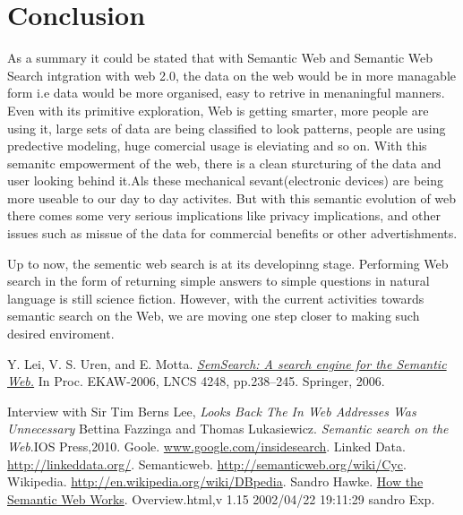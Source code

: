 \documentclass[12pt,a4]{article}
\begin{document}
\section{Conclusion}
As a summary it could be stated that with Semantic Web and Semantic Web Search intgration with web 2.0, the data on the web would be in more managable form i.e  data would be more organised, easy to  retrive in menaningful manners. Even with its primitive exploration, Web is getting smarter, more people are using it, large sets of data are being classified to look patterns, people are using predective modeling, huge comercial usage is eleviating and so on. With this semanitc empowerment of the web, there is a clean sturcturing of the data and user looking behind it.Als these mechanical sevant(electronic devices) are being more useable to our day to day activites. But with this semantic evolution of web there comes some very serious implications like privacy implications, and other issues such as missue of the data for commercial benefits or other advertishments.

Up to now, the sementic web search is at its developinng stage. Performing Web search in the form of returning simple answers to simple questions in natural language is still science fiction. However, with the current activities towards semantic search on the Web, we are moving one step closer to making such desired enviroment.

\begin{thebibliography}{9}
 Y. Lei, V. S. Uren, and E. Motta. \href{http://citeseerx.ist.psu.edu/viewdoc/download?doi=10.1.1.98.3235\&rep=rep1\&type=pdf}{
    \textit{ SemSearch: A search engine for the Semantic Web.}} In Proc. EKAW-2006, LNCS 4248, pp.238--245. Springer, 2006.

 Interview with Sir Tim Berns Lee, \textit{Looks Back The In Web Addresses Was Unnecessary}
 Bettina Fazzinga and Thomas Lukasiewicz. \textit{Semantic search on the Web}.IOS Press,2010.
 Goole. \url{www.google.com/insidesearch}.
  Linked Data. \url{http://linkeddata.org/}.
Semanticweb. \url{http://semanticweb.org/wiki/Cyc}.
Wikipedia. \url{ http://en.wikipedia.org/wiki/DBpedia}.
 Sandro Hawke. \href{http://www.w3.org}{How the Semantic Web Works}. Overview.html,v 1.15 2002/04/22 19:11:29 sandro Exp.

\end{thebibliography}
\end{document}
